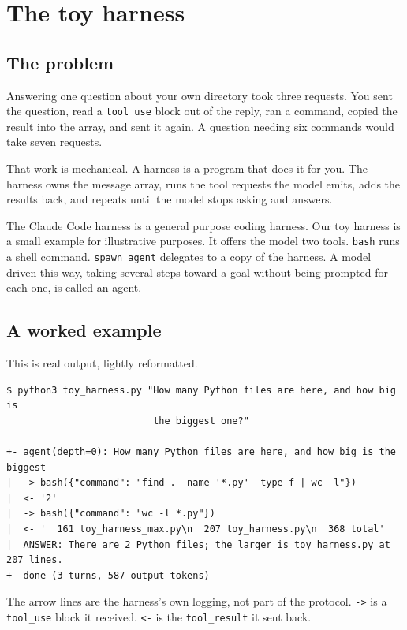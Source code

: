 \documentclass[11pt]{article}
\newenvironment{keep}{\par\addvspace{0.5\baselineskip}\noindent\begin{minipage}{\linewidth}}{\end{minipage}}
\newcommand{\code}[1]{\texttt{#1}}
\begin{document}
\section{The toy harness}

\subsection{The problem}

Answering one question about your own directory took three requests. You sent the
question, read a \code{tool\_use} block out of the reply, ran a command, copied
the result into the array, and sent it again. A question needing six commands
would take seven requests.

That work is mechanical. A harness is a program that does it for you. The harness
owns the message array, runs the tool requests the model emits, adds the results
back, and repeats until the model stops asking and answers.

The Claude Code harness is a general purpose coding harness. Our toy harness is a
small example for illustrative purposes. It offers the model two tools.
\code{bash} runs a shell command. \code{spawn\_agent} delegates to a copy of the
harness. A model driven this way, taking several steps toward a goal without
being prompted for each one, is called an agent.

\subsection{A worked example}

This is real output, lightly reformatted.

\begin{keep}
\begin{lstlisting}
$ python3 toy_harness.py "How many Python files are here, and how big is
                          the biggest one?"

+- agent(depth=0): How many Python files are here, and how big is the biggest
|  -> bash({"command": "find . -name '*.py' -type f | wc -l"})
|  <- '2'
|  -> bash({"command": "wc -l *.py"})
|  <- '  161 toy_harness_max.py\n  207 toy_harness.py\n  368 total'
|  ANSWER: There are 2 Python files; the larger is toy_harness.py at 207 lines.
+- done (3 turns, 587 output tokens)
\end{lstlisting}
\end{keep}

The arrow lines are the harness's own logging, not part of the protocol.
\code{->} is a \code{tool\_use} block it received. \code{<-} is the
\code{tool\_result} it sent back.
\end{document}
